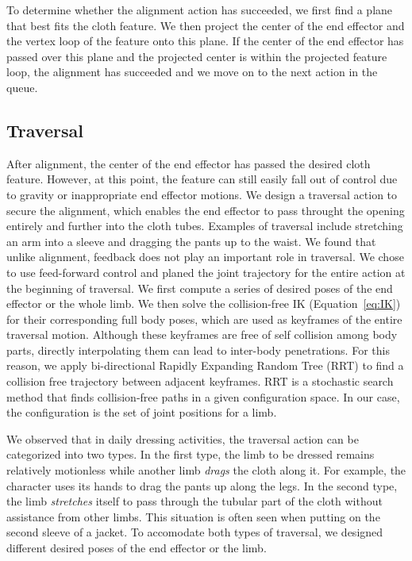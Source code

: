 To determine whether the alignment action has succeeded, we first find a plane that best fits the cloth feature. We then project the center of the end effector and the vertex loop of the feature onto this plane. If the center of the end effector has passed over this plane and the projected center is within the projected feature loop, the alignment has succeeded and we move on to the next action in the queue.

\subsection{Traversal}
After alignment, the center of the end effector has passed the desired cloth feature. However, at this point, the feature can still easily fall out of control due to gravity or inappropriate end effector motions. We design a traversal action to secure the alignment, which enables the end effector to pass throught the opening entirely and further into the cloth tubes. Examples of traversal include stretching an arm into a sleeve and dragging the pants up to the waist. We found that unlike alignment, feedback does not play an important role in traversal. We chose to use feed-forward control and planed the joint trajectory for the entire action at the beginning of traversal. We first compute a series of desired poses of the end effector or the whole limb. We then solve the collision-free IK (Equation~\ref{eq:IK}) for their corresponding full body poses, which are used as keyframes of the entire traversal motion. Although these keyframes are free of self collision among body parts, directly interpolating them can lead to inter-body penetrations. For this reason, we apply bi-directional Rapidly Expanding Random Tree (RRT) \cite{LaValleK:2001} to find a collision free trajectory between adjacent keyframes. RRT is a stochastic search method that finds collision-free paths in a given configuration space. In our case, the configuration is the set of joint positions for a limb.

We observed that in daily dressing activities, the traversal action can be categorized into two types. In the first type, the limb to be dressed remains relatively motionless while another limb \emph{drags} the cloth along it. For example, the character uses its hands to drag the pants up along the legs. In the second type, the limb \emph{stretches} itself to pass through the tubular part of the cloth without assistance from other limbs. This situation is often seen when putting on the second sleeve of a jacket. To accomodate both types of traversal, we designed different desired poses of the end effector or the limb.


